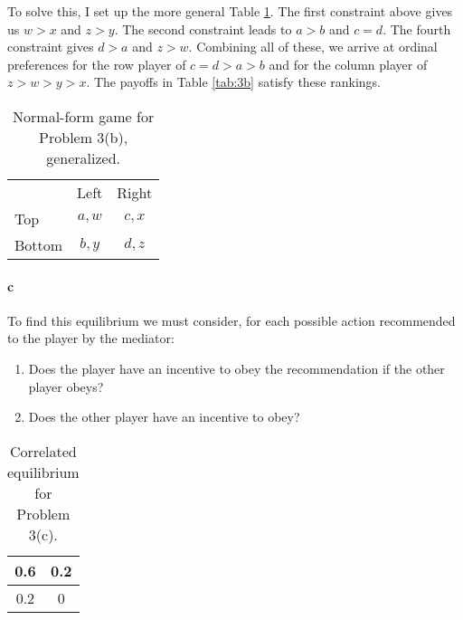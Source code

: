 \begin{answer}{3}
To solve this, I set up the more general Table \ref{tab:3b-general}. The first constraint above gives us $w>x$ and $z>y$. The second constraint leads to $a>b$ and $c=d$. The fourth constraint gives $d>a$ and $z>w$. Combining all of these, we arrive at ordinal preferences for the row player of $c=d > a > b$ and for the column player of $z>w>y>x$. The payoffs in Table \ref{tab:3b} satisfy these rankings.

\begin{table}[h!]
\begin{center}
\begin{tabular}{l|c|c|}
\multicolumn{1}{c}{} & \multicolumn{1}{c}{Left} & \multicolumn{1}{c}{Right} \\
\cline{2-3}
Top    & $a, w$ & $c, x$  \\
\cline{2-3}
Bottom & $b, y$ & $d, z$ \\
\cline{2-3}
\end{tabular}
\caption{Normal-form game for Problem 3(b), generalized.}
\label{tab:3b-general}
\end{center}
\end{table}



\paragraph{c}  To find this equilibrium we must consider, for each possible action recommended to the player by the mediator:
\begin{enumerate}
\item Does the player have an incentive to obey the recommendation if the other player obeys?
\item Does the other player have an incentive to obey?
\end{enumerate}

\begin{table}[h!]
\begin{center}
\begin{tabular}{|c|c|}
\hline
0.6 & 0.2 \\
\hline
0.2 & 0  \\
\hline
\end{tabular}
\caption{Correlated equilibrium for Problem 3(c).}
\label{tab:3c}
\end{center}
\end{table}


\end{answer}
